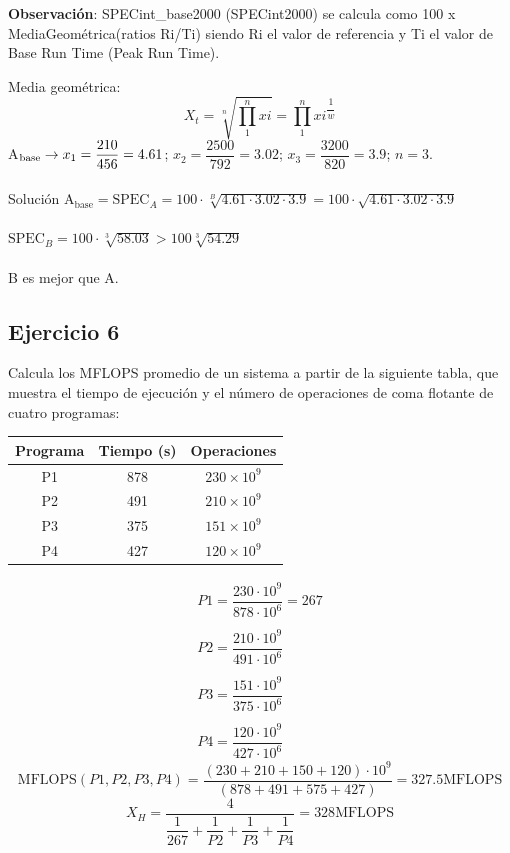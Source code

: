 \noindent
\textbf{Observación}: SPECint\_base2000 (SPECint2000) se calcula como 100 x MediaGeométrica(ratios Ri/Ti) siendo Ri el valor de referencia y Ti el valor de Base Run Time (Peak Run Time).
\begin{tcolorbox}[colback=white,colframe=cyan!50!black,fonttitle=\bfseries]
Media geométrica:
\[
X_t=\sqrt[n]{\prod_1^n xi}=\prod_1^n xi^{\dfrac{1}{w}}
\]
A$_{\text{base}}\rightarrow x_1=\dfrac{210}{456}=4.61$; $x_2=\dfrac{2500}{792}=3.02$; $x_3=\dfrac{3200}{820}=3.9$; $n=3$.\\\\
Solución A$_{\text{base}}=\text{SPEC}_A=100\cdot\sqrt[B]{4.61\cdot 3.02\cdot 3.9}=100\cdot\sqrt{4.61\cdot 3.02\cdot 3.9}$\\\\
$\text{SPEC}_B=100\cdot\sqrt[3]{58.03}>100\sqrt[3]{54.29}$\\\\
B es mejor que A.
\end{tcolorbox}
\subsection{Ejercicio 6}
\noindent
Calcula los MFLOPS promedio de un sistema a partir de la siguiente tabla, que muestra el tiempo de ejecución y el número de operaciones de coma flotante de cuatro programas:
\begin{table}[H]
\centering
\begin{tabular}{|c|c|c|}
\hline
\textbf{Programa} & \textbf{Tiempo (s)} & \textbf{Operaciones} \\ \hline
P1                & 878                 & $230\times10^9$               \\ \hline
P2                & 491                 & $210\times10^9$               \\ \hline
P3                & 375                 & $151\times10^9$               \\ \hline
P4                & 427                 & $120\times10^9$               \\ \hline
\end{tabular}
\end{table}
\begin{tcolorbox}[colback=white,colframe=cyan!50!black,fonttitle=\bfseries]
\[\left.\begin{array}{llll}
P1=\dfrac{230\cdot 10^9}{878\cdot 10^6}=267\\\\
P2=\dfrac{210\cdot 10^9}{491\cdot 10^6}\\\\
P3=\dfrac{151\cdot 10^9}{375\cdot 10^6}\\\\
P4=\dfrac{120\cdot 10^9}{427\cdot 10^6}
\end{array}\right.
\]
\[
\text{MFLOPS}(P1,P2,P3,P4)=\dfrac{(230+210+150+120)\cdot 10^9}{(878+491+575+427)}=327.5\text{MFLOPS}
\]
\[
X_H=\dfrac{4}{\dfrac{1}{267}+\dfrac{1}{P2}+\dfrac{1}{P3}+\dfrac{1}{P4}}=328\text{MFLOPS}
\]
\end{tcolorbox}

